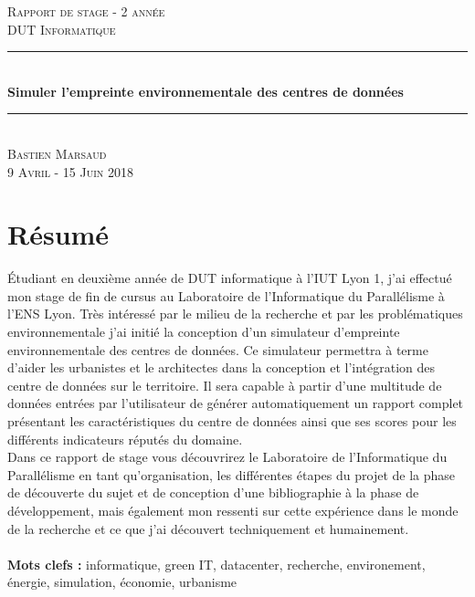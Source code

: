 \newpage
\thispagestyle{empty}
\begin{spacing}{1}
	
	\newcommand{\HRule}{\rule{\linewidth}{0.5mm}}
	\begin{center}
		\textsc{\LARGE Rapport de stage - 2 année \\ DUT Informatique}\\
		\HRule \\[0.8cm]
		{ \huge \bfseries Simuler l'empreinte environnementale des centres de données}\\[0.4cm]
		\HRule \\[0.5cm]
		
		\textsc{\Large Bastien Marsaud}\\
		\textsc{\Large 9 Avril - 15 Juin 2018}\\
	\end{center}
	
	\section*{Résumé}
	Étudiant en deuxième année de DUT informatique à l'IUT Lyon 1, j'ai effectué mon stage de fin de cursus au Laboratoire de l'Informatique du Parallélisme à l'ENS Lyon. Très intéressé par le milieu de la recherche et par les problématiques environnementale j'ai initié la conception d'un simulateur d'empreinte environnementale des centres de données. Ce simulateur permettra à terme d'aider les urbanistes et le architectes dans la conception et l'intégration des centre de données sur le territoire. Il sera capable à partir d'une multitude de données entrées par l'utilisateur de générer automatiquement un rapport complet présentant les caractéristiques du centre de données ainsi que ses scores pour les différents indicateurs réputés du domaine.\\
	Dans ce rapport de stage vous découvrirez le Laboratoire de l'Informatique du Parallélisme en tant qu'organisation, les différentes étapes du projet de la phase de découverte du sujet et de conception d'une bibliographie à la phase de développement, mais également mon ressenti sur cette expérience dans le monde de la recherche et ce que j'ai découvert techniquement et humainement.\\\\
	
	\textbf{Mots clefs :} informatique, green IT, datacenter, recherche, environement, énergie, simulation, économie, urbanisme


\end{spacing}
